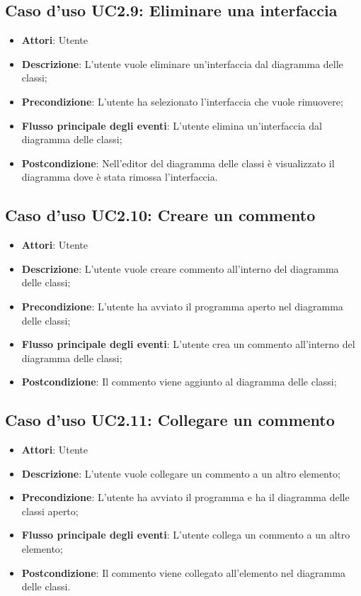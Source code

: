 \documentclass[../AnalisiDeiRequisiti.tex]{subfiles}
\begin{document}
		\subsection{Caso d'uso UC2.9: Eliminare una interfaccia}
		\begin{itemize}
			\item \textbf{Attori}: Utente
			\item \textbf{Descrizione}: L'utente vuole eliminare un'interfaccia dal diagramma delle classi;
			\item \textbf{Precondizione}: L'utente ha selezionato l'interfaccia che vuole rimuovere;
			\item \textbf{Flusso principale degli eventi}: L'utente elimina un'interfaccia dal diagramma delle classi;
			\item \textbf{Postcondizione}: Nell'editor del diagramma delle classi è visualizzato il diagramma dove è stata rimossa l'interfaccia.
		\end{itemize}
		\subsection{Caso d'uso UC2.10: Creare un commento}
		\begin{itemize}
			\item \textbf{Attori}: Utente
			\item \textbf{Descrizione}: L'utente vuole creare commento all'interno del diagramma delle classi;
			\item \textbf{Precondizione}: L'utente ha avviato il programma aperto nel diagramma delle classi;
			\item \textbf{Flusso principale degli eventi}: L'utente crea un commento all'interno del diagramma delle classi;
			\item \textbf{Postcondizione}: Il commento viene aggiunto al diagramma delle classi;
		\end{itemize}
		\subsection{Caso d'uso UC2.11: Collegare un commento}
		\begin{itemize}
			\item \textbf{Attori}: Utente
			\item \textbf{Descrizione}: L'utente vuole collegare un commento a un altro elemento;
			\item \textbf{Precondizione}: L'utente ha avviato il programma e ha il diagramma delle classi aperto;
			\item \textbf{Flusso principale degli eventi}: L'utente collega un commento a un altro elemento;
			\item \textbf{Postcondizione}: Il commento viene collegato all'elemento nel diagramma delle classi.
		\end{itemize}
\end{document}
